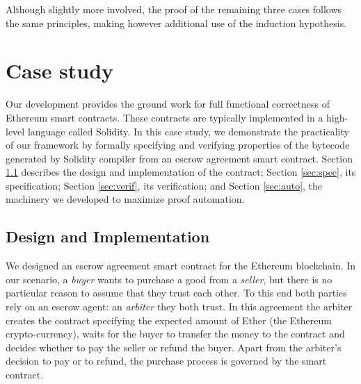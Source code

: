 \documentclass[sigplan,10pt]{acmart}\settopmatter{printfolios=true,printccs=false,printacmref=false}
\begin{document}
Although slightly more involved, the proof of the remaining three cases follows the
same principles,
making however additional use of the induction hypothesis.
%
\section{Case study}
\label{sec:case}



Our development provides the ground work for full functional correctness
of Ethereum smart contracts.
These contracts are typically implemented in a high-level
language called Solidity.
In this case study, we demonstrate the practicality of our framework
by formally specifying and verifying properties of the bytecode 
generated by Solidity compiler from an escrow agreement smart contract.
Section \ref{sec:design} describes the design and implementation of
the contract; Section \ref{sec:spec}, its specification;
Section \ref{sec:verif}, its verification;
and Section \ref{sec:auto}, the machinery we developed
to maximize proof automation.

\subsection{Design and Implementation}
\label{sec:design}
%
We designed an escrow agreement smart contract for the Ethereum blockchain.
In our scenario, a \textit{buyer} wants to purchase a good from a \textit{seller},
but there is no particular reason to assume that they trust each other.
To this end both parties rely on an
escrow agent: an \textit{arbiter} they both trust. 
In this agreement the arbiter creates the contract specifying the
expected amount of Ether (the Ethereum crypto-currency), waits for the buyer to transfer the money to
the contract and decides whether to pay the seller or refund the buyer.
Apart from the arbiter's decision to pay or to refund, the purchase process
is governed by the smart contract.
\end{document}
